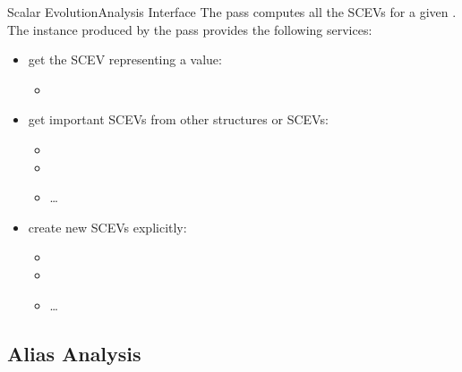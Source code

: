 \begin{frame}{Scalar Evolution}{Analysis Interface}
\centering
The  pass computes all the
SCEVs for a given .
\vfill
\centering
The  instance produced by the pass
provides the following services:
\vfill
\begin{itemize}
\item get the SCEV representing a value:
\begin{itemize}
\item      {}
\end{itemize}
\vfill
\item get important SCEVs from other structures or SCEVs:
\begin{itemize}
\item      {}
\item      {}
\item      \ldots
\end{itemize}
\vfill
\item create new SCEVs explicitly:
\begin{itemize}
\item {}
\item {}
\item \ldots
\end{itemize}
\end{itemize}
\end{frame}


\subsection{Alias Analysis}


